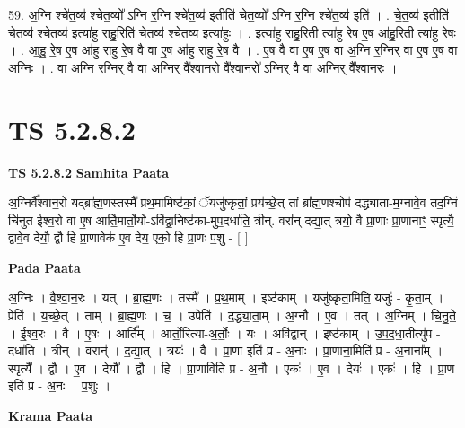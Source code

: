\documentclass[17pt]{extarticle}
\begin{document}
59. अ॒ग्नि श्चे॑त॒व्य॑ श्चेत॒व्यो᳚ ऽग्नि र॒ग्नि श्चे॑त॒व्य॑ इतीति॑ चेत॒व्यो᳚ ऽग्नि र॒ग्नि श्चे॑त॒व्य॑ इति॑ । . चे॒त॒व्य॑ इतीति॑ चेत॒व्य॑ श्चेत॒व्य॑ इत्या॑हु राहु॒रिति॑ चेत॒व्य॑ श्चेत॒व्य॑ इत्या॑हुः । . इत्या॑हु राहु॒रिती त्या॑हु रे॒ष ए॒ष आ॑हु॒रिती त्या॑हु रे॒षः । . आ॒हु॒ रे॒ष ए॒ष आ॑हु राहु रे॒ष वै वा ए॒ष आ॑हु राहु रे॒ष वै । . ए॒ष वै वा ए॒ष ए॒ष वा अ॒ग्नि र॒ग्निर् वा ए॒ष ए॒ष वा अ॒ग्निः । . वा अ॒ग्नि र॒ग्निर् वै वा अ॒ग्निर् वै᳚श्वान॒रो वै᳚श्वान॒रो᳚ ऽग्निर् वै वा अ॒ग्निर् वै᳚श्वान॒रः । \newline
\pagebreak
{}

\section{ TS 5.2.8.2 }

\textbf{TS 5.2.8.2 } \newline
\textbf{Samhita Paata} \newline

अ॒ग्निर्वै᳚श्वान॒रो यद्ब्रा᳚ह्म॒णस्तस्मै᳚ प्रथ॒मामिष्ट॑कां॒ ॅयजु॑ष्कृतां॒ प्रय॑च्छे॒त् तां ब्रा᳚ह्म॒णश्चोप॑ दद्ध्याता-म॒ग्नावे॒व तद॒ग्निं चि॑नुत ईश्व॒रो वा ए॒ष आर्ति॒मार्तो॒र्यो-ऽवि॑द्वा॒निष्ट॑का-मुप॒दधा॑ति॒ त्रीन्. वरा᳚न् दद्या॒त् त्रयो॒ वै प्रा॒णाः प्रा॒णानाꣳ॒॒ स्पृत्यै॒ द्वावे॒व देयौ॒ द्वौ हि प्रा॒णावेक॑ ए॒व देय॒ एको॒ हि प्रा॒णः प॒शु - [  ] \newline

\textbf{Pada Paata} \newline

अ॒ग्निः । वै॒श्वा॒न॒रः । यत् । ब्रा॒ह्म॒णः । तस्मै᳚ । प्र॒थ॒माम् । इष्ट॑काम् । यजु॑ष्कृता॒मिति॒ यजुः॑ - कृ॒ता॒म् । प्रेति॑ । य॒च्छे॒त् । ताम् । ब्रा॒ह्म॒णः । च॒ । उपेति॑ । द॒द्ध्या॒ता॒म् । अ॒ग्नौ । ए॒व । तत् । अ॒ग्निम् । चि॒नु॒ते॒ । ई॒श्व॒रः । वै । ए॒षः । आर्ति᳚म् । आर्तो॒रित्या-अ॒र्तोः॒ । यः । अवि॑द्वान् । इष्ट॑काम् । उ॒प॒द॒धा॒तीत्यु॑प - दधा॑ति । त्रीन् । वरान्॑ । द॒द्या॒त् । त्रयः॑ । वै । प्रा॒णा इति॑ प्र - अ॒नाः । प्रा॒णाना॒मिति॑ प्र - अ॒नाना᳚म् । स्पृत्यै᳚ । द्वौ । ए॒व । देयौ᳚ । द्वौ । हि । प्रा॒णाविति॑ प्र - अ॒नौ । एकः॑ । ए॒व । देयः॑ । एकः॑ । हि । प्रा॒ण इति॑ प्र - अ॒नः । प॒शुः ।  \newline


\textbf{Krama Paata} \newline
\end{document}
